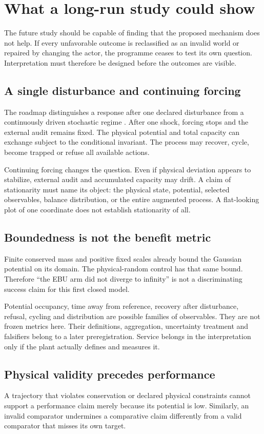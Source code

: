 \chapter{What a long-run study could show}\label{ch:interpretation}
The future study should be capable of finding that the proposed mechanism
does not help. If every unfavorable outcome is reclassified as an invalid
world or repaired by changing the actor, the programme ceases to test its
own question. Interpretation must therefore be designed before the outcomes
are visible.

\section{A single disturbance and continuing forcing}
The roadmap distinguishes a response after one declared disturbance from
a continuously driven stochastic regime \cite{roadmap}. After one shock,
forcing stops and the external audit remains fixed. The physical potential
and total capacity can exchange subject to the conditional invariant.
The process may recover, cycle, become trapped or refuse all available actions.

Continuing forcing changes the question. Even if physical deviation appears
to stabilize, external audit and accumulated capacity may drift. A claim
of stationarity must name its object: the physical state, potential,
selected observables, balance distribution, or the entire augmented process.
A flat-looking plot of one coordinate does not establish stationarity of all.

\section{Boundedness is not the benefit metric}
Finite conserved mass and positive fixed scales already bound the Gaussian
potential on its domain. The physical-random control has that same bound.
Therefore ``the EBU arm did not diverge to infinity'' is not a discriminating
success claim for this first closed model.

Potential occupancy, time away from reference, recovery after disturbance,
refusal, cycling and distribution are possible families of observables.
They are not frozen metrics here. Their definitions, aggregation, uncertainty
treatment and falsifiers belong to a later preregistration. Service belongs
in the interpretation only if the plant actually defines and measures it.

\section{Physical validity precedes performance}
A trajectory that violates conservation or declared physical constraints
cannot support a performance claim merely because its potential is low.
Similarly, an invalid comparator undermines a comparative claim differently
from a valid comparator that misses its own target.

